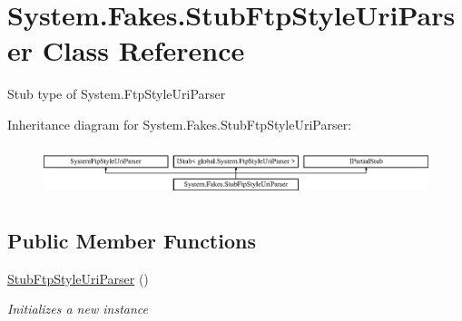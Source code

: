 \hypertarget{class_system_1_1_fakes_1_1_stub_ftp_style_uri_parser}{\section{System.\-Fakes.\-Stub\-Ftp\-Style\-Uri\-Parser Class Reference}
\label{class_system_1_1_fakes_1_1_stub_ftp_style_uri_parser}
}


Stub type of System.\-Ftp\-Style\-Uri\-Parser 


Inheritance diagram for System.\-Fakes.\-Stub\-Ftp\-Style\-Uri\-Parser\-:\begin{figure}[H]
\begin{center}
\leavevmode
\includegraphics[height=1.469816cm]{class_system_1_1_fakes_1_1_stub_ftp_style_uri_parser}
\end{center}
\end{figure}
\subsection*{Public Member Functions}
\begin{DoxyCompactItemize}
\item 
\hyperlink{class_system_1_1_fakes_1_1_stub_ftp_style_uri_parser_a45c000fc7229c8aeb345ad229887c735}{Stub\-Ftp\-Style\-Uri\-Parser} ()
\begin{DoxyCompactList}\small\item\em Initializes a new instance\end{DoxyCompactList}\end{DoxyCompactItemize}
